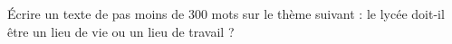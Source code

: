 
\begin{exercice}\label{exosmath-0424}

    Écrire un texte de pas moins de 300 mots sur le thème suivant : le lycée doit-il être un lieu de vie ou un lieu de travail ?

\end{exercice}
